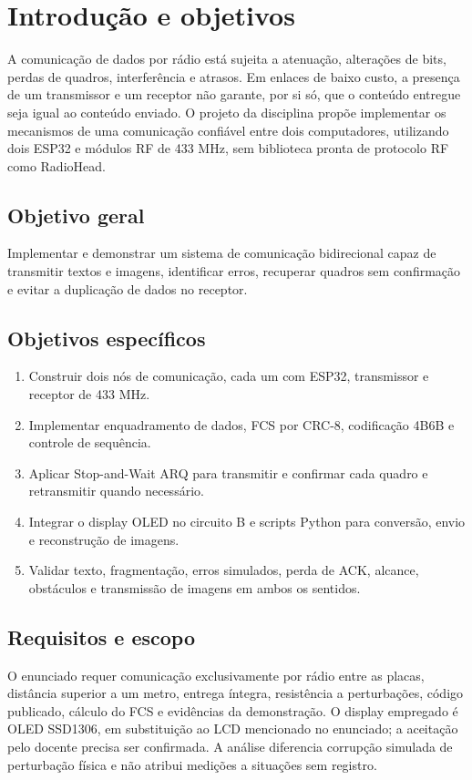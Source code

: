 \clearpage\section{Introdução e objetivos}
A comunicação de dados por rádio está sujeita a atenuação, alterações de bits, perdas de quadros, interferência e atrasos. Em enlaces de baixo custo, a presença de um transmissor e um receptor não garante, por si só, que o conteúdo entregue seja igual ao conteúdo enviado. O projeto da disciplina propõe implementar os mecanismos de uma comunicação confiável entre dois computadores, utilizando dois ESP32 e módulos RF de 433 MHz, sem biblioteca pronta de protocolo RF como RadioHead.

\setcounter{subsection}{0}\subsection{Objetivo geral}
Implementar e demonstrar um sistema de comunicação bidirecional capaz de transmitir textos e imagens, identificar erros, recuperar quadros sem confirmação e evitar a duplicação de dados no receptor.

\setcounter{subsection}{1}\subsection{Objetivos específicos}
\begin{enumerate}
\item Construir dois nós de comunicação, cada um com ESP32, transmissor e receptor de 433 MHz.
\item Implementar enquadramento de dados, FCS por CRC-8, codificação 4B6B e controle de sequência.
\item Aplicar Stop-and-Wait ARQ para transmitir e confirmar cada quadro e retransmitir quando necessário.
\item Integrar o display OLED no circuito B e scripts Python para conversão, envio e reconstrução de imagens.
\item Validar texto, fragmentação, erros simulados, perda de ACK, alcance, obstáculos e transmissão de imagens em ambos os sentidos.
\end{enumerate}
\setcounter{subsection}{2}\subsection{Requisitos e escopo}
O enunciado requer comunicação exclusivamente por rádio entre as placas, distância superior a um metro, entrega íntegra, resistência a perturbações, código publicado, cálculo do FCS e evidências da demonstração. O display empregado é OLED SSD1306, em substituição ao LCD mencionado no enunciado; a aceitação pelo docente precisa ser confirmada. A análise diferencia corrupção simulada de perturbação física e não atribui medições a situações sem registro.



